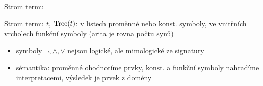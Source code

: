 \documentclass{beamer}
\begin{document}
\begin{frame}{Strom termu}
    
    \vspace{-3pt}
    \alert{Strom termu} $t$, \alert{$\operatorname{Tree}(t)$}: v listech proměnné nebo konst. symboly, ve vnitřních vrcholech funkční symboly (arita je rovna počtu synů)

    \begin{center}

    \end{center}

    \begin{itemize}
        \item symboly $\neg,\land,\lor$ nejsou logické, ale mimologické ze signatury
        \item \alert{sémantika}: proměnné ohodnotíme prvky, konst. a funkční symboly nahradíme interpretacemi, výsledek je prvek z domény
    \end{itemize}
    
\end{frame}
\end{document}
